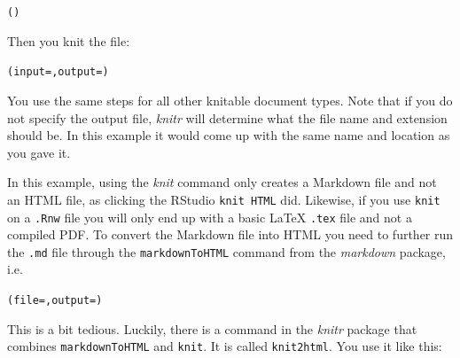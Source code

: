 \documentclass[krantz1]{krantz}
\begin{document}
\begin{knitrout}
\color{fgcolor}\begin{kframe}
\begin{alltt}
()
\end{alltt}
\end{kframe}
\end{knitrout}


\noindent Then you knit the file:

\begin{knitrout}
\color{fgcolor}\begin{kframe}
\begin{alltt}
(input = , output = )
\end{alltt}
\end{kframe}
\end{knitrout}


\noindent You use the same steps for all other knitable document types. Note that if you do not specify the output file, {\emph{knitr}} will determine what the file name and extension should be. In this example it would come up with the same name and location as you gave it.

In this example, using the {\emph{knit}} command only creates a Markdown file and not an HTML file, as clicking the RStudio {\tt{knit HTML}} did. Likewise, if you use {\tt{knit}} on a {\tt{.Rnw}} file you will only end up with a basic LaTeX {\tt{.tex}} file and not a compiled PDF. To convert the Markdown file into HTML you need to further run the {\tt{.md}} file through the {\tt{markdownToHTML}} command from the {\emph{markdown}} package, i.e.

\begin{knitrout}
\color{fgcolor}\begin{kframe}
\begin{alltt}
(file = , output = )
\end{alltt}
\end{kframe}
\end{knitrout}


\noindent This is a bit tedious. Luckily, there is a command in the {\emph{knitr}} package that combines \texttt{markdownToHTML} and \texttt{knit}. It is called \texttt{knit2html}. You use it like this:
\end{document}
